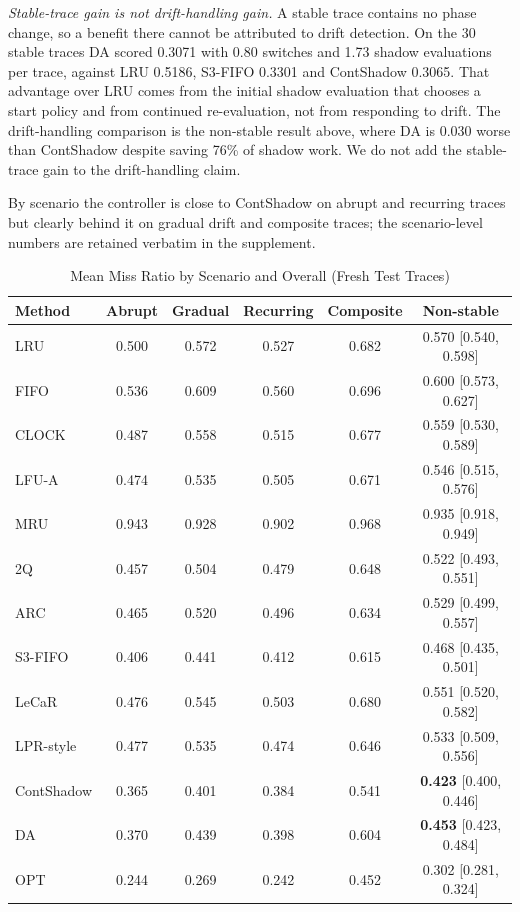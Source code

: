\documentclass[10pt,twocolumn,a4paper]{IEEEtran}
\begin{document}
\emph{Stable-trace gain is not drift-handling gain.} A stable trace contains no
phase change, so a benefit there cannot be attributed to drift detection. On
the 30 stable traces DA scored 0.3071 with 0.80 switches and 1.73 shadow
evaluations per trace, against LRU 0.5186, S3-FIFO 0.3301 and ContShadow
0.3065. That advantage over LRU comes from the initial shadow evaluation that
chooses a start policy and from continued re-evaluation, not from responding
to drift. The drift-handling comparison is the non-stable result above, where
DA is 0.030 worse than ContShadow despite saving 76\% of shadow work. We do
not add the stable-trace gain to the drift-handling claim.

By scenario the controller is close to ContShadow on abrupt and recurring
traces but clearly behind it on gradual drift and composite traces; the
scenario-level numbers are retained verbatim in the supplement.

\begin{table}[!t]
\caption{Mean Miss Ratio by Scenario and Overall (Fresh Test Traces)}
\label{tab:quality}
\footnotesize
\setlength{\tabcolsep}{2pt}
\begin{tabular}{@{}lccccc@{}}
\toprule
Method & Abrupt & Gradual & Recurring & Composite & Non-stable \\
\midrule
LRU & 0.500 & 0.572 & 0.527 & 0.682 & 0.570 [0.540, 0.598] \\
FIFO & 0.536 & 0.609 & 0.560 & 0.696 & 0.600 [0.573, 0.627] \\
CLOCK & 0.487 & 0.558 & 0.515 & 0.677 & 0.559 [0.530, 0.589] \\
LFU-A & 0.474 & 0.535 & 0.505 & 0.671 & 0.546 [0.515, 0.576] \\
MRU & 0.943 & 0.928 & 0.902 & 0.968 & 0.935 [0.918, 0.949] \\
2Q & 0.457 & 0.504 & 0.479 & 0.648 & 0.522 [0.493, 0.551] \\
ARC & 0.465 & 0.520 & 0.496 & 0.634 & 0.529 [0.499, 0.557] \\
S3-FIFO & 0.406 & 0.441 & 0.412 & 0.615 & 0.468 [0.435, 0.501] \\
LeCaR & 0.476 & 0.545 & 0.503 & 0.680 & 0.551 [0.520, 0.582] \\
LPR-style & 0.477 & 0.535 & 0.474 & 0.646 & 0.533 [0.509, 0.556] \\
ContShadow & 0.365 & 0.401 & 0.384 & 0.541 & \textbf{0.423} [0.400, 0.446] \\
DA & 0.370 & 0.439 & 0.398 & 0.604 & \textbf{0.453} [0.423, 0.484] \\
OPT & 0.244 & 0.269 & 0.242 & 0.452 & 0.302 [0.281, 0.324] \\
\bottomrule
\end{tabular}
\end{table}
\end{document}

